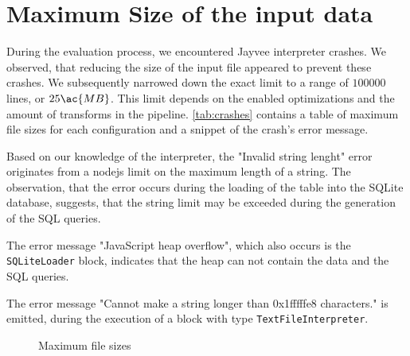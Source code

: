 \section{Maximum Size of the input data}
During the evaluation process, we encountered Jayvee interpreter crashes.
We observed, that reducing the size of the input file appeared to prevent these crashes.
We subsequently narrowed down the exact limit to a range of $100 000$ lines, or $25\ac{MB}$.
This limit depends on the enabled optimizations and the amount of transforms in the pipeline.
\ref{tab:crashes} contains a table of maximum file sizes for each configuration and a snippet of the crash's error message.

Based on our knowledge of the interpreter, the "Invalid string lenght" error originates from a nodejs limit on the maximum length of a string. %
The observation, that the error occurs during the loading of the table into the SQLite database, suggests, that the string limit may be exceeded during the generation of the \ac{SQL} queries.

The error message "JavaScript heap overflow", which also occurs is the \Verb|SQLiteLoader| block, indicates that the heap can not contain the data and the \ac{SQL} queries.

The error message "Cannot make a string longer than 0x1fffffe8 characters." is emitted, during the execution of a block with type \Verb|TextFileInterpreter|.

\begin{figure}
	\caption{Maximum file sizes}
	\label{fig:plot:filesize}
\end{figure}


